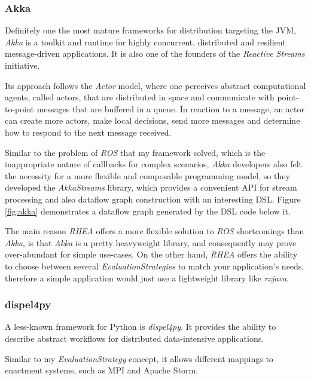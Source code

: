 \documentclass[sigplan,review,anonymous]{acmart}\settopmatter{printfolios=true}
\begin{document}
\subsubsection{Akka}

Definitely one the most mature frameworks for distribution targeting the JVM, \textit{Akka} is a toolkit and runtime for highly concurrent, distributed and resilient message-driven applications. It is also one of the founders of the \textit{Reactive Streams}\cite{rss} initiative.

Its approach follows the \textit{Actor} model\cite{actor}, where one perceives abstract computational agents, called actors, that are distributed in space and communicate with point-to-point messages that are buffered in a queue. In reaction to a message, an actor can create more actors, make local decisions, send more messages and determine how to respond to the next message received.

Similar to the problem of \textit{ROS} that my framework solved, which is the inappropriate nature of callbacks for complex scenarios, \textit{Akka} developers also felt the necessity for a more flexible and composable programming model, so they developed the \textit{AkkaStreams} library, which provides a convenient API for stream processing and also dataflow graph construction with an interesting DSL. Figure \ref{fig:akka} demonstrates a dataflow graph generated by the DSL code below it.


The main reason \textit{RHEA} offers a more flexible solution to \textit{ROS} shortcomings than \textit{Akka}, is that \textit{Akka} is a pretty heavyweight library, and consequently may prove over-abundant for simple use-cases. On the other hand, \textit{RHEA} offers the ability to choose between several \textit{EvaluationStrategies} to match your application's needs, therefore a simple application would just use a lightweight library like \textit{rxjava}.

\subsubsection{dispel4py}

A less-known framework for Python is \textit{dispel4py}. It provides the ability to describe abstract workflows for distributed data-intensive applications.

Similar to my \textit{EvaluationStrategy} concept, it allows different mappings to enactment systems, such as MPI and Apache Storm.
\end{document}
